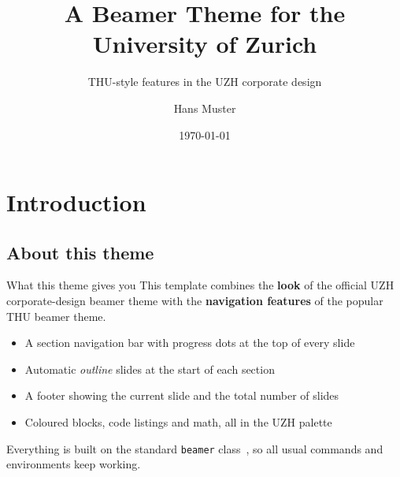 \documentclass[aspectratio=169,onlytextwidth]{beamer}
\title{A Beamer Theme for the University of Zurich}
\subtitle{THU-style features in the UZH corporate design}
\author{Hans Muster}
\date{\today}
\institute{Department of XYZ}
\begin{document}
\maketitle

\uzhoutlineframe


\section{Introduction}

\subsection{About this theme}

\begin{frame}{What this theme gives you}
  This template combines the \textbf{look} of the official UZH corporate-design
  beamer theme with the \textbf{navigation features} of the popular THU beamer
  theme.

  \begin{itemize}
    \item A section navigation bar with progress dots at the top of every slide
    \item Automatic \emph{outline} slides at the start of each section
    \item A footer showing the current slide and the total number of slides
    \item Coloured blocks, code listings and math, all in the UZH palette
  \end{itemize}

  Everything is built on the standard \texttt{beamer} class~\cite{lamport1994latex},
  so all usual commands and environments keep working.
\end{frame}

\begin{frame}{}

  \begin{steplist}
  \end{steplist}

\end{frame}
\end{document}

